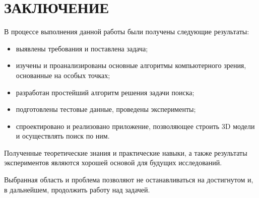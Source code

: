 \chapter*{ЗАКЛЮЧЕНИЕ}

В процессе выполнения данной работы были получены следующие результаты:

\begin{itemize}
    \item выявлены требования и поставлена задача;
    \item изучены и проанализированы основные алгоритмы компьютерного зрения, основанные на особых точках;
    \item разработан простейший алгоритм решения задачи поиска;
    \item подготовлены тестовые данные, проведены эксперименты;
    \item спроектировано и реализовано приложение, позволяющее строить 3D модели и осуществлять поиск по ним.
\end{itemize}

Полученные теоретические знания и практические навыки, а также результаты экспериментов являются хорошей основой для будущих исследований.

Выбранная область и проблема позволяют не останавливаться на достигнутом и, в дальнейшем, продолжить работу над задачей.
\newpage
